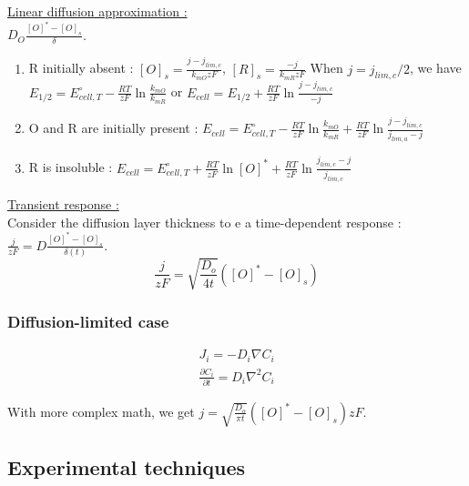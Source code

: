 \documentclass[../main.tex]{subfiles}
\begin{document}
\quad \underline{Linear diffusion approximation :}\\
$D_O \frac{[O]^* - [O]_s}{\delta}$.\\
\begin{enumerate}
    \item R initially absent : $[O]_s = \frac{j-j_{lim,c}}{k_{mO} zF}$, $[R]_s = \frac{-j}{k_{mR} zF}$
    When $j = j_{lim,c}/2$, we have $E_{1/2} = E^\circ_{cell,T} - \frac{RT}{zF} \ln \frac{k_{mO}}{k_{mR}}$ or $E_{cell} = E_{1/2} + \frac{RT}{zF} \ln \frac{j-j_{lim,c}}{-j}$

    \item O and R are initially present : $E_{cell} = E^\circ_{cell,T} - \frac{RT}{zF} \ln \frac{k_{mO}}{k_{mR}} + \frac{RT}{zF} \ln \frac{j-j_{lim,c}}{j_{lim,a} - j}$

    \item R is insoluble : $E_{cell} = E^\circ_{cell,T} + \frac{RT}{zF} \ln [O]^* + \frac{RT}{zF} \ln \frac{j_{lim,c} - j}{j_{lim,c}}$
\end{enumerate}

\quad \underline{Transient response :}\\
Consider the diffusion layer thickness to e a time-dependent response : $\frac{j}{zF} = D\frac{[O]^* - [O]_s}{\delta(t)}$.\\

\begin{equation}
    \frac{j}{zF} = \sqrt{\frac{D_o}{4t}} ([O]^* - [O]_s)
\end{equation}

\subsubsection{Diffusion-limited case}

\begin{equation}
    \begin{gathered}
        J_i = - D_i \nabla C_i\\
        \frac{\partial C_i}{\partial t} = D_i \nabla^2 C_i
    \end{gathered}
\end{equation}

With more complex math, we get $j = \sqrt{\frac{D_o}{\pi t}} ([O]^* - [O]_s) zF$.

\subsection{Experimental techniques}
\end{document}
